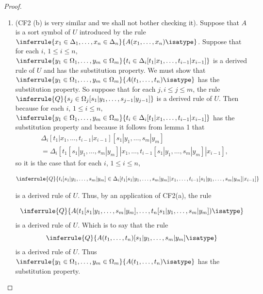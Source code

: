 \begin{proof}
\begin{enumerate}
    \item[CF2 (a).] (CF2 (b) is very similar and we shall not bother checking it).
      Suppose that $A$ is a sort symbol of $U$ introduced by the rule $\inferrule{x_1\in\Delta_1,\ldots,x_n\in\Delta_n}{A(x_1,\ldots,x_n)\isatype}$.
      Suppose that for each $i$, $1\leq i\leq n$, $\inferrule{y_1\in\Omega_1,\ldots,y_m\in\Omega_m}{t_i\in\Delta_i[t_1|x_1,\ldots,t_{i-1}|x_{i-1}]}$ is a derived rule of $U$ and has the substitution property.
      We must show that $\inferrule{y_1\in\Omega_1,\ldots,y_m\in\Omega_m}{A(t_1,\ldots,t_n)\isatype}$ has the substitution property.
      So suppose that for each $j, i\leq j\leq m$, the rule $\inferrule{Q}{s_j\in\Omega_j[s_1|y_1,\ldots,s_{j-1}|y_{j-1}]}$ is a derived rule of $U$.
      Then because for each $i$, $1\leq i\leq n$, $\inferrule{y_1\in\Omega_1,\ldots,y_m\in\Omega_m}{t_i\in\Delta_i[t_1|x_1,\ldots,t_{i-1}|x_{i-1}]}$ has the substitution property and because it follows from lemma 1 that
      \begin{align*}
        &\Delta_i[t_1|x_1,\ldots,t_{i-1}|x_{i-1}][s_1|y_1,\ldots,s_m|y_m]\\
        &=\Delta_i[t_1[s_1|y_1,\ldots,s_m|y_m]|x_1,\ldots,t_{i-1}[s_1|y_1,\ldots,s_m|y_m]|x_{i-1}],
      \end{align*}
      so it is the case that for each $i$, $1\leq i\leq n$,

      \[ \inferrule{Q}{t_i[s_1|y_1,\ldots,s_m|y_m]\in\Delta_i[t_1[s_1|y_1,\ldots,s_m|y_m]|x_1,\ldots,t_{i-1}[s_1|y_1,\ldots,s_m|y_m]|x_{i-1}]}\]

      is a derived rule of $U$.
      Thus, by an application of CF2(a), the rule

      \[ \inferrule{Q}{A(t_1[s_1|y_1,\ldots,s_m|y_m],\ldots,t_n[s_1|y_1,\ldots,s_m|y_m])\isatype}\]
      is a derived rule of $U$. Which is to say that the rule
      \[\inferrule{Q}{A(t_1,\ldots,t_n)[s_1|y_1,\ldots,s_m|y_m]\isatype}\] is a derived rule of $U$.
      Thus $\inferrule{y_1\in\Omega_1,\ldots, y_m\in\Omega_m}{A(t_1,\ldots,t_n)\isatype}$ has the substitution property.
  \end{enumerate}
\end{proof}

